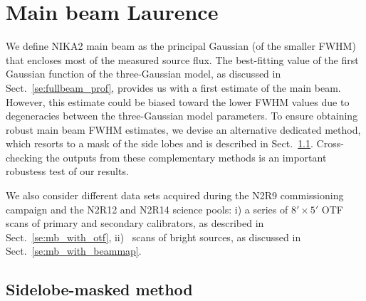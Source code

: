 \section{Main beam {\color{blue} Laurence}}
\label{se:MB}


We define NIKA2 main beam as the principal Gaussian (of the smaller FWHM)
that encloses most of the measured source flux. The best-fitting value
of the first Gaussian function of the
three-Gaussian model, as discussed in Sect.~\ref{se:fullbeam_prof},
provides us with a first estimate of the main beam. %
However, this estimate could be biased toward the lower FWHM values due to
degeneracies between the three-Gaussian model parameters. To ensure
obtaining robust main beam FWHM estimates, we devise %
an alternative dedicated method, which resorts to a mask of the side
lobes and is described in Sect.~\ref{se:sidelobe_masked_method}.
Cross-checking the outputs from these complementary methods is an
important robustess test of our results.

We also consider different data sets acquired during the N2R9
commissioning campaign and the N2R12 and N2R14 science pools: i) a
series of $8' \times 5'$ OTF scans of primary and secondary
calibrators, as described in Sect.~\ref{se:mb_with_otf}, ii)
\bm\ scans of bright sources, as discussed in
Sect.~\ref{se:mb_with_beammap}.



\subsection{Sidelobe-masked method}
\label{se:sidelobe_masked_method}

